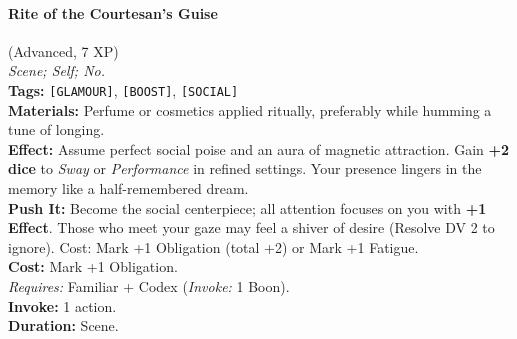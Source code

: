 \paragraph{Rite of the Courtesan's Guise} (Advanced, 7 XP) \hfill \\
\emph{Scene; Self; No.} \\
\textbf{Tags:} \texttt{[GLAMOUR]}, \texttt{[BOOST]}, \texttt{[SOCIAL]} \\
\textbf{Materials:} Perfume or cosmetics applied ritually, preferably while humming a tune of longing. \\
\textbf{Effect:} Assume perfect social poise and an aura of magnetic attraction. Gain \textbf{+2 dice} to \textit{Sway} or \textit{Performance} in refined settings. Your presence lingers in the memory like a half-remembered dream. \\
\textbf{Push It:} Become the social centerpiece; all attention focuses on you with \textbf{+1 Effect}. Those who meet your gaze may feel a shiver of desire (Resolve DV 2 to ignore). Cost: Mark +1 Obligation (total +2) or Mark +1 Fatigue. \\
\textbf{Cost:} Mark +1 Obligation. \\
\textit{Requires:} Familiar + Codex (\textit{Invoke:} 1 Boon). \\
\textbf{Invoke:} 1 action. \\
\textbf{Duration:} Scene.

